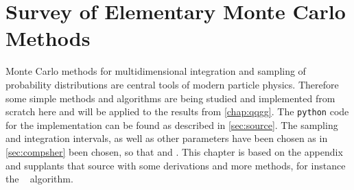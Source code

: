 
\chapter{Survey of Elementary Monte Carlo Methods}%
\label{chap:mc}

Monte Carlo methods for multidimensional integration and sampling of
probability distributions are central tools of modern particle
physics. Therefore some simple methods and algorithms are being
studied and implemented from scratch here and will be applied to the
results from \cref{chap:qqgg}. The \verb|python| code for the
implementation can be found as described in \cref{sec:source}. The
sampling and integration intervals, as well as other parameters have
been chosen as in \cref{sec:compsher} been chosen, so that
 and . This chapter is
based on the appendix~\cite{buckley:2011ge} and supplants that source
with some derivations and more methods, for instance the
\vegas~\cite{Lepage:19781an} algorithm.
